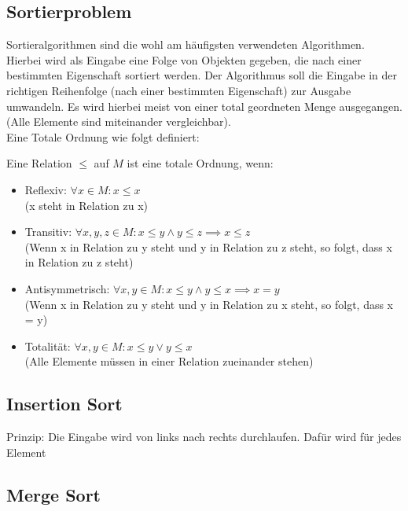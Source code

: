\documentclass[ngerman,
color=3b,
load_common, %
boxarc,
main,
tikz,
border=3mm
]{article}
\begin{document}
\subsection{Sortierproblem}
Sortieralgorithmen sind die wohl am häufigsten verwendeten Algorithmen. Hierbei wird als Eingabe eine Folge von Objekten gegeben, die nach einer bestimmten Eigenschaft sortiert werden. Der Algorithmus soll die Eingabe in der richtigen Reihenfolge (nach einer bestimmten Eigenschaft) zur Ausgabe umwandeln. Es wird hierbei meist von einer total geordneten Menge ausgegangen. (Alle Elemente sind miteinander vergleichbar). \\
Eine Totale Ordnung wie folgt definiert:
\begin{center}
    Eine Relation $\leq$ auf $M$ ist eine totale Ordnung, wenn:
    \begin{itemize}
        \item Reflexiv: $\forall x \in M: x \leq x$ \\
        (x steht in Relation zu x)
        \item Transitiv: $\forall x,y,z \in M: x \leq y \wedge y \leq z \implies x \leq z$ \\
        (Wenn x in Relation zu y steht und y in Relation zu z steht, so folgt, dass x in Relation zu z steht)
        \item Antisymmetrisch: $\forall x,y \in M: x \leq y \wedge y \leq x \implies x = y$ \\
        (Wenn x in Relation zu y steht und y in Relation zu x steht, so folgt, dass x = y)
        \item Totalität: $\forall x,y \in M: x \leq y \vee y \leq x$ \\
        (Alle Elemente müssen in einer Relation zueinander stehen)
    \end{itemize}
\end{center}

\newpage
\subsection{Insertion Sort}


Prinzip: Die Eingabe wird von links nach rechts durchlaufen. Dafür wird für jedes Element 

\newpage
\subsection[]{Merge Sort}
\end{document}
